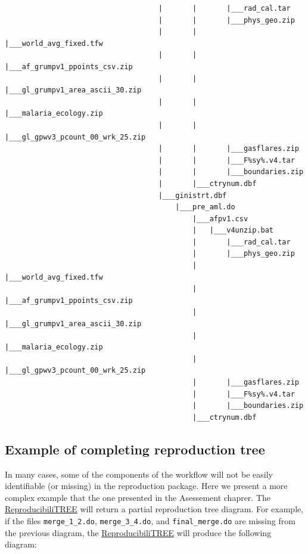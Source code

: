 \documentclass[
]{book}
\begin{document}
\begin{verbatim}
                                    |       |       |___rad_cal.tar
                                    |       |       |___phys_geo.zip
                                    |       |       |___world_avg_fixed.tfw
                                    |       |       |___af_grumpv1_ppoints_csv.zip
                                    |       |       |___gl_grumpv1_area_ascii_30.zip
                                    |       |       |___malaria_ecology.zip
                                    |       |       |___gl_gpwv3_pcount_00_wrk_25.zip
                                    |       |       |___gasflares.zip
                                    |       |       |___F%sy%.v4.tar
                                    |       |       |___boundaries.zip
                                    |       |___ctrynum.dbf
                                    |___ginistrt.dbf
                                        |___pre_aml.do
                                            |___afpv1.csv
                                            |   |___v4unzip.bat
                                            |       |___rad_cal.tar
                                            |       |___phys_geo.zip
                                            |       |___world_avg_fixed.tfw
                                            |       |___af_grumpv1_ppoints_csv.zip
                                            |       |___gl_grumpv1_area_ascii_30.zip
                                            |       |___malaria_ecology.zip
                                            |       |___gl_gpwv3_pcount_00_wrk_25.zip
                                            |       |___gasflares.zip
                                            |       |___F%sy%.v4.tar
                                            |       |___boundaries.zip
                                            |___ctrynum.dbf
\end{verbatim}

\hypertarget{example-of-completing-reproduction-tree}{%
\subsection{Example of completing reproduction tree}\label{example-of-completing-reproduction-tree}}

In many cases, some of the components of the workflow will not be easily identifiable (or missing) in the reproduction package. Here we present a more complex example that the one presented in the Asessement chaprer. The \protect\hyperlink{diagram}{ReproducibiliTREE} will return a partial reproduction tree diagram. For example, if the files \texttt{merge\_1\_2.do}, \texttt{merge\_3\_4.do}, and \texttt{final\_merge.do} are missing from the previous diagram, the \protect\hyperlink{diagram}{ReproducibiliTREE} will produce the following diagram:
\end{document}
